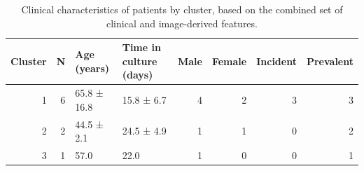 \begin{table}[htbp]
    \centering
    \caption{Clinical characteristics of patients by cluster, based on the combined set of clinical and image-derived features.}
    \label{tab:cluster_clinical_all_features}
\begin{tabular}{rrllrrrr}
\toprule
Cluster & N & Age (years) & Time in culture (days) & Male & Female & Incident & Prevalent \\
\midrule
1 & 6 & 65.8 ± 16.8 & 15.8 ± 6.7 & 4 & 2 & 3 & 3 \\
2 & 2 & 44.5 ± 2.1 & 24.5 ± 4.9 & 1 & 1 & 0 & 2 \\
3 & 1 & 57.0 & 22.0 & 1 & 0 & 0 & 1 \\
\bottomrule
\end{tabular}

\end{table}
